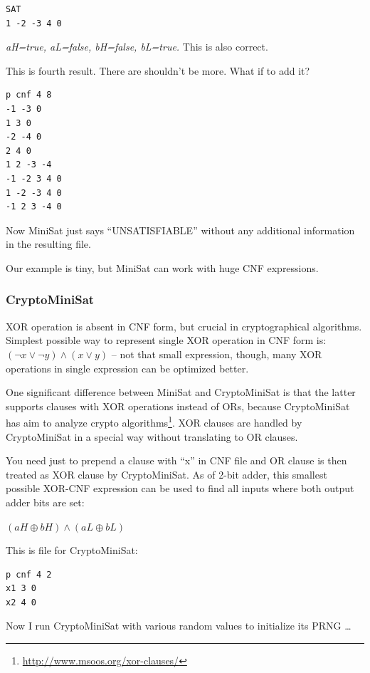 \begin{lstlisting}
SAT
1 -2 -3 4 0
\end{lstlisting}

\textit{aH=true, aL=false, bH=false, bL=true.} This is also correct.

This is fourth result. There are shouldn't be more. What if to add it?

\begin{lstlisting}
p cnf 4 8
-1 -3 0
1 3 0
-2 -4 0
2 4 0
1 2 -3 -4
-1 -2 3 4 0
1 -2 -3 4 0
-1 2 3 -4 0
\end{lstlisting}

Now MiniSat just says ``UNSATISFIABLE'' without any additional information in the resulting file.

Our example is tiny, but MiniSat can work with huge \ac{CNF} expressions.

\subsubsection{CryptoMiniSat}

XOR operation is absent in \ac{CNF} form, but crucial in cryptographical algorithms.
Simplest possible way to represent single XOR operation in \ac{CNF} form is:
$(\neg x \vee \neg y) \wedge (x \vee y)$ -- not that small expression, 
though, many XOR operations in single expression can be optimized better.

One significant difference between MiniSat and CryptoMiniSat is that
the latter supports clauses with XOR operations instead of ORs,
because CryptoMiniSat has aim to analyze crypto algorithms\footnote{\url{http://www.msoos.org/xor-clauses/}}.
XOR clauses are handled by CryptoMiniSat in a special way without translating to OR clauses.

You need just to prepend a clause with ``x'' in \ac{CNF} file and OR clause is then treated as XOR clause by CryptoMiniSat.
As of 2-bit adder, this smallest possible XOR-CNF expression can be used to find all inputs where both output adder bits are set:

$(aH \oplus bH) \wedge (aL \oplus bL)$

This is  file for CryptoMiniSat:

\begin{lstlisting}
p cnf 4 2
x1 3 0
x2 4 0
\end{lstlisting}

Now I run CryptoMiniSat with various random values to initialize its \ac{PRNG} \dots

